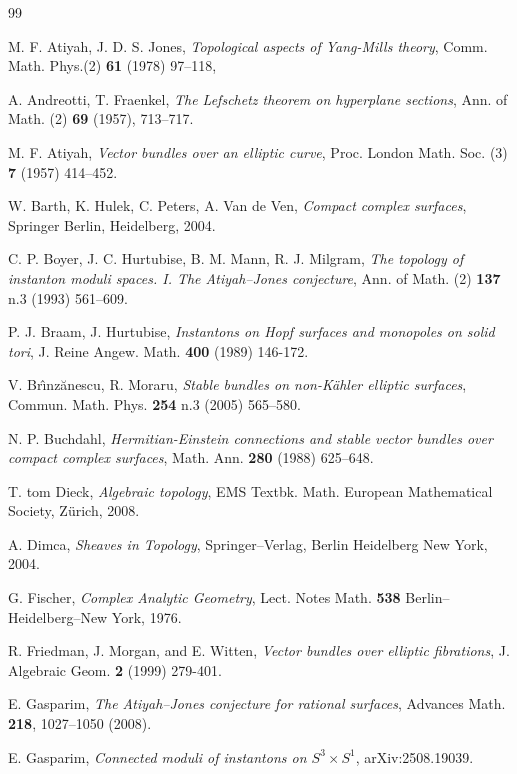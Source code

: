 \documentclass[
  a4paper, 
  reqno, 
  oneside, 
  11pt
]{amsart}
\theoremstyle{plain}	%
\theoremstyle{mydef} %
\theoremstyle{remark}
\theoremstyle{definition}
\theoremstyle{remark}
\begin{document}
\begin{thebibliography}{99}

 M. F. Atiyah, J. D. S. Jones, {\it Topological aspects of Yang-Mills theory}, Comm.
Math. Phys.(2) {\bf 61}  (1978) 97–118,

 A. Andreotti, T. Fraenkel, {\it The Lefschetz theorem on hyperplane sections},  
Ann. of Math. (2) {\bf 69} (1957), 713--717.

  M. F. Atiyah, {\it Vector bundles over an elliptic curve}, Proc. London Math. Soc. (3) {\bf 7} (1957)  414--452.




 W. Barth, K. Hulek, C. Peters,  A. Van de Ven, 
{\it Compact complex surfaces}, Springer
Berlin, Heidelberg, 2004.


 C. P. Boyer, J. C. Hurtubise, B. M.  Mann, R. J. Milgram, 
{\it The topology of instanton moduli spaces. I. The Atiyah–Jones conjecture}, Ann. of Math. (2) {\bf 137} n.3 (1993)
 561--609.

 P. J. Braam, J. Hurtubise,
{\it Instantons on Hopf surfaces and monopoles on solid tori}, J. Reine Angew. Math. {\bf 400} (1989)
146-172.


 V. Br\^{\i}nz\u{a}nescu, R. Moraru, {\it Stable bundles on non-K\"ahler elliptic surfaces},
Commun. Math. Phys. {\bf 254}  n.3   (2005) 565--580.


 N. P. Buchdahl, 
{\it Hermitian-Einstein connections and stable
vector bundles over compact complex surfaces}, Math. Ann. {\bf 280} (1988) 625--648.

 T. tom Dieck, 
{\it Algebraic topology},
EMS Textbk. Math.
European Mathematical Society, Zürich, 2008. 

 A. Dimca, {\it Sheaves in Topology}, Springer--Verlag, Berlin Heidelberg New York, 2004.

 G. Fischer, {\it Complex Analytic Geometry}, Lect. Notes 
 Math. {\bf 538}  Berlin--Heidelberg--New York, 1976.


R. Friedman, J. Morgan, and E. Witten, 
{\it Vector bundles over
elliptic fibrations}, J. Algebraic Geom. {\bf 2} (1999) 279-401.


 E. Gasparim,  {\it The Atiyah--Jones conjecture for rational surfaces},
      Advances Math. {\bf 218}, 1027--1050 (2008).

 E. Gasparim, {\it Connected moduli of instantons on $S^3\times S^1$}, arXiv:2508.19039.



\end{thebibliography}
\end{document}
